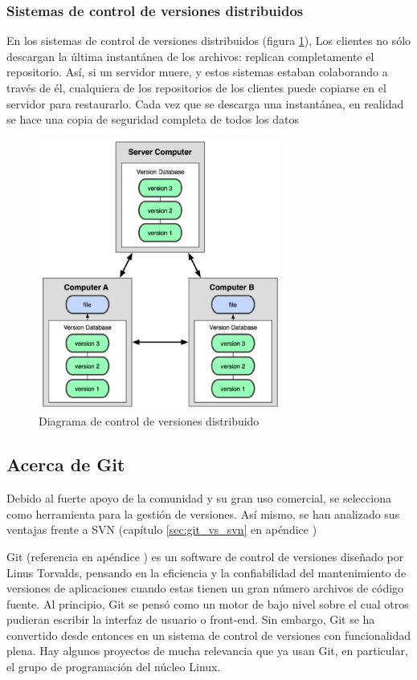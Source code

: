 \subsubsection{Sistemas de control de versiones distribuidos}

En los sistemas de control de versiones distribuidos (figura \ref{fig:cvdistrib}), Los clientes no sólo descargan la última instantánea de los archivos: replican completamente el repositorio. Así, si un servidor muere, y estos sistemas estaban colaborando a través de él, cualquiera de los repositorios de los clientes puede copiarse en el servidor para restaurarlo. Cada vez que se descarga una instantánea, en realidad se hace una copia de seguridad completa de todos los datos

\begin{figure}[H]
  \centering
    \includegraphics[width=300px]{./eps/git/git_diag_cv_distribuido.eps}
  \caption{Diagrama de control de versiones distribuido}
  \label{fig:cvdistrib}
\end{figure}

\subsection{Acerca de Git}

Debido al fuerte apoyo de la comunidad y su gran uso comercial, se selecciona como herramienta para la gestión de versiones. Así mismo, se han analizado sus ventajas frente a SVN (capítulo \ref{sec:git_vs_svn} en apéndice )

Git (referencia en apéndice ) es un software de control de versiones diseñado por Linus Torvalds, pensando en la eficiencia y la confiabilidad del mantenimiento de versiones de aplicaciones cuando estas tienen un gran número archivos de código fuente. Al principio, Git se pensó como un motor de bajo nivel sobre el cual otros pudieran escribir la interfaz de usuario o front-end. Sin embargo, Git se ha convertido desde entonces en un sistema de control de versiones con funcionalidad plena. Hay algunos proyectos de mucha relevancia que ya usan Git, en particular, el grupo de programación del núcleo Linux.

